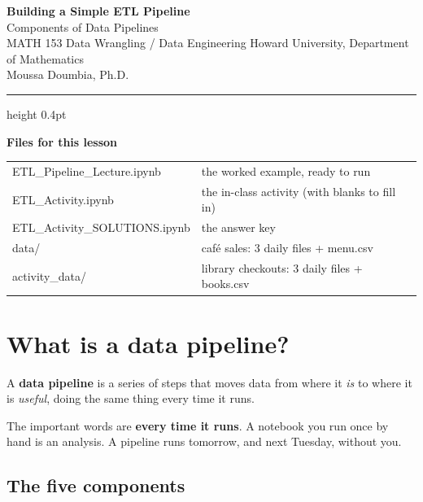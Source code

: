 \documentclass[11pt,letterpaper]{article}
\newcommand{\py}[1]{{\ttfamily\small#1}}
\begin{document}
\begin{center}
  {\sffamily\LARGE\bfseries\color{ink} Building a Simple ETL Pipeline}\\[4pt]
  {\sffamily\large\color{accent} Components of Data Pipelines}\\[9pt]
  {\sffamily\small\color{muted} MATH 153 \textbar{} Data Wrangling / Data Engineering
   \textbar{} Howard University, Department of Mathematics}\\[2pt]
  {\sffamily\small\color{muted} Moussa Doumbia, Ph.D.}
\end{center}

\vspace{6pt}
\color{rule}\hrule height 0.4pt\color{ink}
\vspace{8pt}

{\sffamily\small\color{muted}\textbf{Files for this lesson}}

{\sffamily\footnotesize
\begin{tabular}{@{}p{6.1cm}p{7.8cm}@{}}
\py{ETL\_Pipeline\_Lecture.ipynb} & the worked example, ready to run \\
\py{ETL\_Activity.ipynb}         & the in-class activity (with blanks to fill in) \\
\py{ETL\_Activity\_SOLUTIONS.ipynb} & the answer key \\
\py{data/}                       & caf\'e sales: 3 daily files + \py{menu.csv} \\
\py{activity\_data/}             & library checkouts: 3 daily files + \py{books.csv} \\
\end{tabular}}

\section{What is a data pipeline?}

\begin{keynote}
A \textbf{data pipeline} is a series of steps that moves data from where it \emph{is} to where it is
\emph{useful}, doing the same thing every time it runs.
\end{keynote}

The important words are \textbf{every time it runs}. A notebook you run once by hand is an analysis.
A pipeline runs tomorrow, and next Tuesday, without you.

\subsection{The five components}
\end{document}
